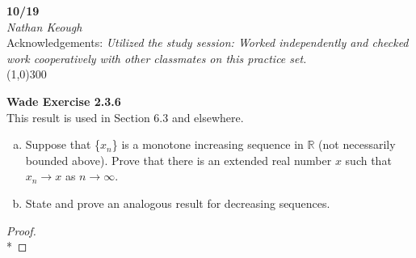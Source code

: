 \documentclass[a4paper]{article}
\newcommand{\real}{\mathbb{R}}
\begin{document}
    \begin{center}
        \Large \textbf{10/19} \\
        \large \textit{Nathan Keough} \\
        Acknowledgements: \emph{Utilized the study session: Worked independently and checked work cooperatively with other classmates on this practice set.} \vspace{.5pc} \\ \line(1,0){300} 
        \vspace{1pc}
    \end{center} 
    
    \begin{flushleft}


        \textbf{Wade Exercise 2.3.6} \\
        This result is used in Section 6.3 and elsewhere.  \\
        \begin{enumerate}[a.]
            \item Suppose that \{$x_n$\} is a monotone increasing sequence in $\real$ (not necessarily bounded above). Prove that there is an extended real number $x$ such that $x_n \to x$ as $n \to \infty$. 
            \item State and prove an analogous result for decreasing sequences. 
        \end{enumerate} 


        \begin{proof}\mbox{}\\*


\end{proof}
\end{flushleft}
\end{document}
